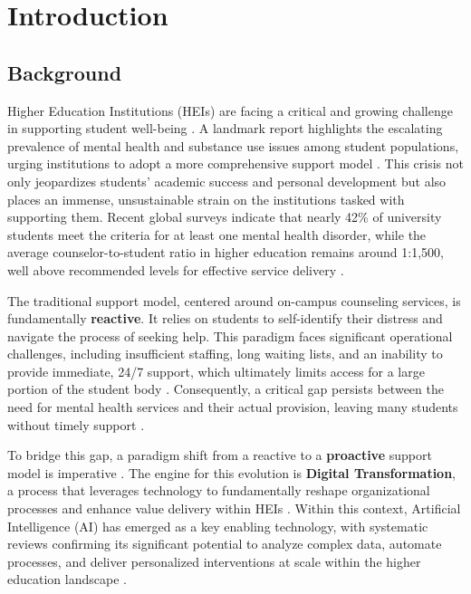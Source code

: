 \chapter{Introduction}
\label{chap:introduction}

\section{Background}
\label{sec:background}


Higher Education Institutions (HEIs) are facing a critical and growing challenge in supporting student well-being \cite{hill2024studentwellbeing, duraku2024overcoming}. A landmark report highlights the escalating prevalence of mental health and substance use issues among student populations, urging institutions to adopt a more comprehensive support model \cite{scherer2021mentalhealth}. This crisis not only jeopardizes students' academic success and personal development but also places an immense, unsustainable strain on the institutions tasked with supporting them. Recent global surveys indicate that nearly 42\% of university students meet the criteria for at least one mental health disorder, while the average counselor-to-student ratio in higher education remains around 1:1,500, well above recommended levels for effective service delivery \cite{lipson2022healthy, gallagher2023counselor}.

The traditional support model, centered around on-campus counseling services, is fundamentally \textbf{reactive}. It relies on students to self-identify their distress and navigate the process of seeking help. This paradigm faces significant operational challenges, including insufficient staffing, long waiting lists, and an inability to provide immediate, 24/7 support, which ultimately limits access for a large portion of the student body \cite{baik2019universities}. Consequently, a critical gap persists between the need for mental health services and their actual provision, leaving many students without timely support \cite{outay2024multiagent}.

To bridge this gap, a paradigm shift from a reactive to a \textbf{proactive} support model is imperative \cite{outay2024multiagent}. The engine for this evolution is \textbf{Digital Transformation}, a process that leverages technology to fundamentally reshape organizational processes and enhance value delivery within HEIs \cite{omirali2025digitaltrust}. Within this context, Artificial Intelligence (AI) has emerged as a key enabling technology, with systematic reviews confirming its significant potential to analyze complex data, automate processes, and deliver personalized interventions at scale within the higher education landscape \cite{pati2025agentic, karunanayake2025nextgen}.

